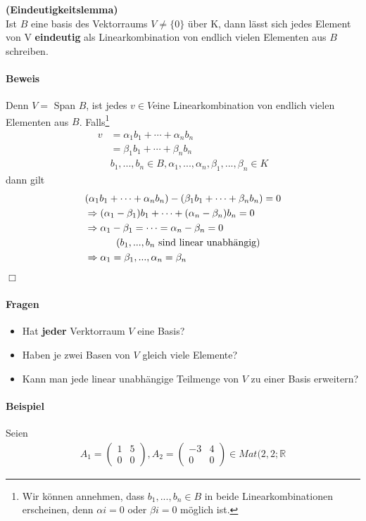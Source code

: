 \documentclass[11pt]{report}
\newcommand*\Zb[1] {\mathbb{#1}}
\newcommand*\f[1] {\textbf{#1}}
\begin{document}
\begin{lemma} \f{(Eindeutigkeitslemma)}\\
 \label{lemma341}
Ist $B$ eine basis des Vektorraums $V\neq \{0\}$ über K, dann lässt sich jedes Element von V \f{eindeutig} als Linearkombination von endlich vielen Elementen aus $B$ schreiben.
\end{lemma}
\paragraph{Beweis}
Denn $V =$ Span $B$, ist jedes  $v \in V$eine Linearkombination von endlich vielen Elementen aus $B$. Falls\footnote{Wir können annehmen, dass $b_1, ..., b_n \in B$ in beide Linearkombinationen erscheinen, denn $\alpha i = 0$ oder $\beta i = 0$ möglich ist.}
\begin{align}
 v &= \alpha_1 b_1 +  \cdots + \alpha_n b_n \\
 &= \beta_1 b_1 + \cdots + \beta_n b_n \\
&b_1, ..., b_n \in B, \alpha_1, ..., \alpha_n, \beta_1, ..., \beta_n \in K
\end{align}
dann gilt
\begin{align}
 &(\alpha_1 b_1 + \cdots + \alpha_n b_n) - (\beta_1 b_1 + \cdots + \beta_n b_n) = 0 \\
&\Rightarrow (\alpha_1 - \beta_1) b_1 + \cdots + (\alpha_n - \beta_n) b_n = 0 \\
&\Rightarrow \alpha_1 - \beta_1 = \cdots = \alpha_n - \beta_n = 0 \\
&\hspace*{1cm}\text{ ($b_1, ..., b_n$ sind linear unabhängig)} \\
&\Rightarrow \alpha_1 = \beta_1, ..., \alpha_n = \beta_n
\end{align}
\hfill $\Box$
\paragraph{Fragen}
\begin{itemize}
 \item Hat \f{jeder} Verktorraum $V$ eine Basis?
 \item Haben je zwei Basen von $V$ gleich viele Elemente?
 \item Kann man jede linear unabhängige Teilmenge von $V$ zu einer Basis erweitern?
\end{itemize}

\paragraph{Beispiel}
Seien
\begin{align}
 A_1 = \begin{pmatrix} 1 & 5 \\ 0 & 0 \end{pmatrix}, A_2 = \begin{pmatrix} -3 & 4 \\ 0 & 0 \end{pmatrix} \in Mat(2,2; \Zb{R}
\end{align}
\end{document}
